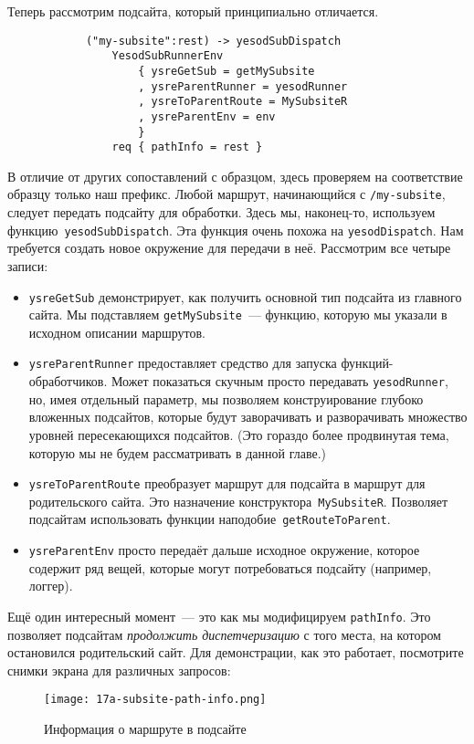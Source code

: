 Теперь рассмотрим подсайта, который принципиально отличается.

\begin{lstlisting}
            ("my-subsite":rest) -> yesodSubDispatch
                YesodSubRunnerEnv
                    { ysreGetSub = getMySubsite
                    , ysreParentRunner = yesodRunner
                    , ysreToParentRoute = MySubsiteR
                    , ysreParentEnv = env
                    }
                req { pathInfo = rest }
\end{lstlisting}

В отличие от других сопоставлений с образцом, здесь проверяем на соответствие
образцу только наш префикс. Любой маршрут, начинающийся с \texttt{/my-subsite},
следует передать подсайту для обработки. Здесь мы, наконец-то, используем
функцию~\lstinline'yesodSubDispatch'. Эта функция очень похожа на
\lstinline'yesodDispatch'. Нам требуется создать новое окружение для передачи в
неё. Рассмотрим все четыре записи:
\begin{itemize}
    \item \lstinline'ysreGetSub' демонстрирует, как получить основной тип
        подсайта из главного сайта. Мы подставляем \lstinline'getMySubsite'~---
        функцию, которую мы указали в исходном описании маршрутов.

    \item \lstinline'ysreParentRunner' предоставляет средство для запуска
        функций-обработчиков. Может показаться скучным просто передавать
        \lstinline'yesodRunner', но, имея отдельный параметр, мы позволяем
        конструирование глубоко вложенных подсайтов, которые будут заворачивать
        и разворачивать множество уровней пересекающихся подсайтов. (Это
        гораздо более продвинутая тема, которую мы не будем рассматривать в
        данной главе.)

    \item \lstinline'ysreToParentRoute' преобразует маршрут для подсайта в
        маршрут для родительского сайта. Это назначение
        конструктора~\lstinline'MySubsiteR'. Позволяет подсайтам использовать
        функции наподобие~\lstinline'getRouteToParent'.

    \item \lstinline'ysreParentEnv' просто передаёт дальше исходное окружение,
        которое содержит ряд вещей, которые могут потребоваться подсайту
        (например, логгер).
\end{itemize}

Ещё один интересный момент~--- это как мы модифицируем \lstinline'pathInfo'.
Это позволяет подсайтам \emph{продолжить диспетчеризацию} с того места, на
котором остановился родительский сайт. Для демонстрации, как это работает,
посмотрите снимки экрана для различных запросов:
\begin{figure}[h!]
  \centering
  \texttt{[image: 17a-subsite-path-info.png]}
  \caption{Информация о маршруте в подсайте}
\end{figure}

